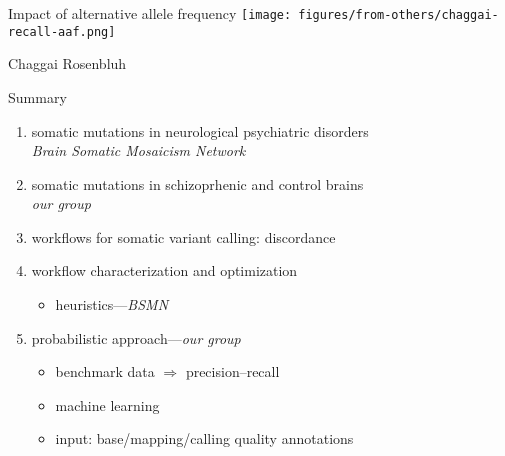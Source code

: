 \documentclass{beamer}
\begin{document}
\begin{frame}{Impact of alternative allele frequency}
\texttt{[image: figures/from-others/chaggai-recall-aaf.png]}

\tiny{Chaggai Rosenbluh}
\end{frame}

\begin{frame}{Summary}
\begin{enumerate}
\item \alert{somatic mutations} in neurological psychiatric disorders\\
\emph{Brain Somatic Mosaicism Network}
\item somatic mutations in \alert{schizoprhenic} and control brains\\
\emph{our group}
\item workflows for somatic variant calling: \alert{discordance}
\item workflow characterization and \alert{optimization}
\begin{itemize}
\item heuristics---\emph{BSMN}
\end{itemize}
\item probabilistic approach---\emph{our group}
\begin{itemize}
\item benchmark data \(\Rightarrow\) precision--recall
\item \alert{machine learning}
\item input: base/mapping/calling \alert{quality annotations}
\end{itemize}
\end{enumerate}
\end{frame}
\end{document}
